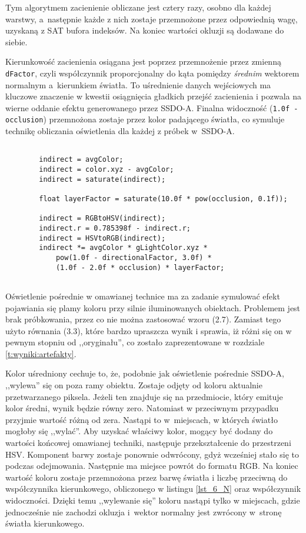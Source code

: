 		Tym algorytmem zacienienie obliczane jest cztery razy, osobno dla każdej warstwy, a~następnie każde z nich zostaje przemnożone przez odpowiednią wagę, uzyskaną z SAT bufora indeksów. Na koniec wartości okluzji są dodawane do siebie.
		
		Kierunkowość zacienienia osiągana jest poprzez przemnożenie przez zmienną \texttt{dFactor}, czyli współczynnik proporcjonalny do kąta pomiędzy \emph{średnim} wektorem normalnym a~kierunkiem światła. To uśrednienie danych wejściowych ma kluczowe znaczenie w kwestii osiągnięcia gładkich przejść zacienienia i pozwala na wierne oddanie efektu generowanego przez SSDO-A. Finalna widoczność (\texttt{1.0f - occlusion}) przemnożona zostaje przez kolor padającego światła, co symuluje technikę obliczania oświetlenia dla każdej z próbek w~SSDO-A.
		
		\begin{lstlisting}[language=HLSL,caption={Obliczenie oświetlenia pośredniego SSDO-B.},label={lst_6_O}]
		
		indirect = avgColor;
		indirect = color.xyz - avgColor;
		indirect = saturate(indirect);
		
		float layerFactor = saturate(10.0f * pow(occlusion, 0.1f));
		
		indirect = RGBtoHSV(indirect);
		indirect.r = 0.785398f - indirect.r;
		indirect = HSVtoRGB(indirect);
		indirect *= avgColor * gLightColor.xyz * 
			pow(1.0f - directionalFactor, 3.0f) * 
			(1.0f - 2.0f * occlusion) * layerFactor;
		
		\end{lstlisting}
		
		Oświetlenie pośrednie w omawianej technice ma za zadanie symulować efekt pojawiania się plamy koloru przy silnie iluminowanych obiektach. Problemem jest brak próbkowania, przez co nie można zastosować wzoru (2.7). Zamiast tego użyto równania (3.3), które bardzo upraszcza wynik i sprawia, iż różni się on w pewnym stopniu od ,,oryginału'', co zostało zaprezentowane w rozdziale \ref{t:wyniki:artefakty}. 
		
		Kolor uśredniony cechuje to, że, podobnie jak oświetlenie pośrednie SSDO-A, ,,wylewa'' się on poza ramy obiektu. Zostaje odjęty od koloru aktualnie przetwarzanego piksela. Jeżeli ten znajduje się na przedmiocie, który emituje kolor średni, wynik będzie równy zero. Natomiast w przeciwnym przypadku przyjmie wartość różną od zera. Nastąpi to w~miejscach, w których światło mogłoby się ,,wylać''. Aby uzyskać właściwy kolor, mogący być dodany do wartości końcowej omawianej techniki, następuje przekształcenie do przestrzeni HSV. Komponent barwy zostaje ponownie odwrócony, gdyż wcześniej stało się to podczas odejmowania. Następnie ma miejsce powrót do formatu RGB. Na koniec wartość koloru zostaje przemnożona przez barwę światła i liczbę przeciwną do współczynnika kierunkowego, obliczonego w listingu \ref{lst_6_N} oraz współczynnik widoczności. Dzięki temu ,,wylewanie się'' koloru nastąpi tylko w miejscach, gdzie jednocześnie nie zachodzi okluzja i~wektor normalny jest zwrócony w~stronę światła kierunkowego.
		
